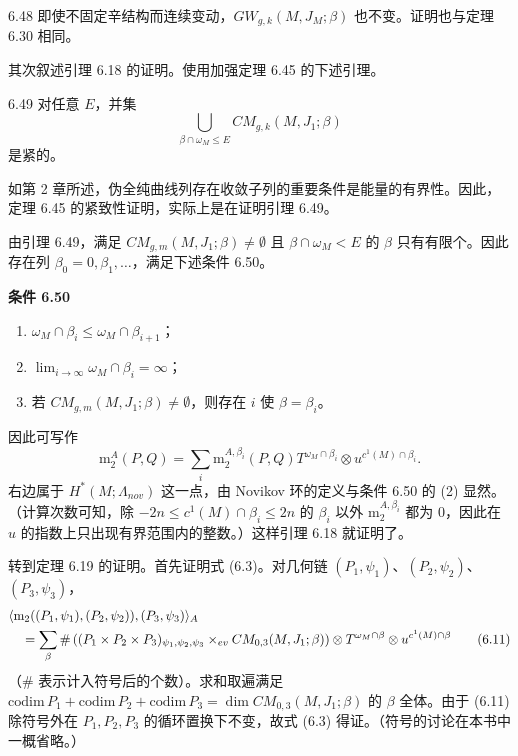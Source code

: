 \begin{remark}{6.48}
  即使不固定辛结构而连续变动，$GW_{g,k}(M,J_M;\beta)$ 也不变。证明也与定理 6.30 相同。
\end{remark}

其次叙述引理 6.18 的证明。使用加强定理 6.45 的下述引理。

\begin{lemma}{6.49}
  对任意 $E$，并集
  \[
    \bigcup_{\beta\cap\omega_M\le E}CM_{g,k}(M,J_1;\beta)
  \]
  是紧的。
\end{lemma}

如第 2 章所述，伪全纯曲线列存在收敛子列的重要条件是能量的有界性。因此，定理 6.45 的紧致性证明，实际上是在证明引理 6.49。

由引理 6.49，满足 $CM_{g,m}(M,J_1;\beta)\neq\emptyset$ 且 $\beta\cap\omega_M<E$ 的 $\beta$ 只有有限个。因此存在列 $\beta_0=0,\beta_1,\dots$，满足下述条件 6.50。

\textbf{条件 6.50}
\begin{enumerate}[label=（\arabic*）]
  \item $\omega_M\cap\beta_i\le\omega_M\cap\beta_{i+1}$；
  \item $\lim_{i\to\infty}\omega_M\cap\beta_i=\infty$；
  \item 若 $CM_{g,m}(M,J_1;\beta)\neq\emptyset$，则存在 $i$ 使 $\beta=\beta_i$。
\end{enumerate}

因此可写作
\[
  \mathrm{m}_2^A(P,Q)=\sum_i\mathrm{m}_2^{A,\beta_i}(P,Q)T^{\omega_M\cap\beta_i}\otimes u^{c^1(M)\cap\beta_i}.
\]
右边属于 $H^*(M;\Lambda_{nov})$ 这一点，由 Novikov 环的定义与条件 6.50 的 (2) 显然。（计算次数可知，除 $-2n\le c^1(M)\cap\beta_i\le2n$ 的 $\beta_i$ 以外 $\mathrm{m}_2^{A,\beta_i}$ 都为 $0$，因此在 $u$ 的指数上只出现有界范围内的整数。）这样引理 6.18 就证明了。

转到定理 6.19 的证明。首先证明式 (6.3)。对几何链 $(P_1,\psi_1)$、$(P_2,\psi_2)$、$(P_3,\psi_3)$，
\begin{align}
  &\langle \mathrm{m}_2((P_1,\psi_1),(P_2,\psi_2)),(P_3,\psi_3)\rangle_A \notag\\
  &\quad=\sum_\beta\#\left((P_1\times P_2\times P_3)_{\psi_1,\psi_2,\psi_3}\times_{ev}CM_{0,3}(M,J_1;\beta)\right)\otimes T^{\omega_M\cap\beta}\otimes u^{c^1(M)\cap\beta} \tag{6.11}
\end{align}
（$\#$ 表示计入符号后的个数）。求和取遍满足 $\mathrm{codim}\,P_1+\mathrm{codim}\,P_2+\mathrm{codim}\,P_3=\dim CM_{0,3}(M,J_1;\beta)$ 的 $\beta$ 全体。由于 (6.11) 除符号外在 $P_1,P_2,P_3$ 的循环置换下不变，故式 (6.3) 得证。（符号的讨论在本书中一概省略。）

